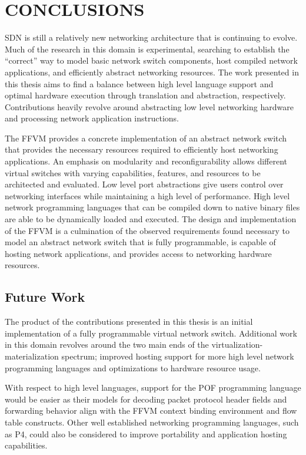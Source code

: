 \chapter{CONCLUSIONS}
\label{concl}
SDN is still a relatively new networking architecture that is continuing
to evolve. Much of the research in this domain is experimental, searching
to establish the ``correct'' way to model basic network switch components,
host compiled network applications, and efficiently abstract networking
resources. The work presented in this thesis aims to find a balance between
high level language support and optimal hardware execution through translation
and abstraction, respectively. Contributions heavily revolve around abstracting
low level networking hardware and processing network application instructions.

The FFVM provides a concrete implementation of an abstract network switch that
provides the necessary resources required to efficiently host networking applications. An emphasis on modularity and reconfigurability allows different virtual switches with varying capabilities, features, and resources to be architected and evaluated. Low level port abstractions give users control over networking interfaces while maintaining a high level of performance. High level network programming languages that can be compiled down to native binary files are able to be dynamically loaded and executed. The design and implementation of the FFVM is a culmination of the observed requirements found necessary to model an abstract network switch that is fully programmable, is capable of hosting network applications, and provides access to networking hardware resources.

\section{Future Work}
\label{concl:future}
The product of the contributions presented in this thesis is an initial implementation of a fully programmable virtual network switch. Additional work in this domain revolves around the two main ends of the virtualization-materialization spectrum; improved hosting support for more high level network programming languages and optimizations to hardware resource usage.

With respect to high level languages, support for the POF programming language would be easier as their models for decoding packet protocol header fields and forwarding behavior align with the FFVM context binding environment and flow table constructs. Other well established networking programming languages, such as P4, could also be considered to improve portability and application hosting capabilities.

